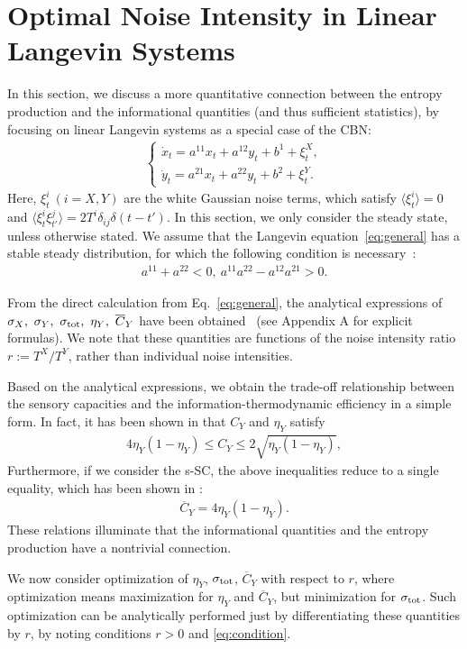 \documentclass[%
 reprint,
 amsmath,amssymb,
 aps,
]{revtex4-1}
\newcommand{\balign}[1]{\begin{align} #1 \end{align}}
\newcommand{\average}[1]{\ensuremath{\langle#1\rangle} }
\newcommand{\eref}[1]{Eq.~\eqref{#1}}
\theoremstyle{plain}
\begin{document}
\section{\label{sec:LLS}Optimal Noise Intensity in Linear Langevin Systems}
In this section, we discuss a more quantitative connection between the entropy production and the informational quantities (and thus sufficient statistics), by focusing on linear Langevin systems as a special case of the CBN:
\begin{eqnarray}
\begin{cases}
\dot{x}_t=a^{11}x_t+a^{12}y_t+b^1+\xi^X_t, \\
\dot{y}_t=a^{21}x_t+a^{22}y_t+b^2+\xi^Y_t. \label{eq:general}
\end{cases}
\end{eqnarray}
Here, $\xi^i_t\ (i=X,Y)$ are the white Gaussian noise terms, which satisfy $\average{\xi^i_t}=0$ and
 $\average{\xi^i_t\xi^j_{t'}}=2T^i\delta_{ij}\delta(t-t')$. In this section, we only consider the steady state, unless otherwise stated. We assume that the Langevin equation~\eqref{eq:general} has a stable steady distribution, for which the following condition is necessary~\cite{Gardiner}: 
\balign{
a^{11}+a^{22}<0, \  a^{11}a^{22}-a^{12}a^{21}>0 \label{eq:condition}.
}

From the direct calculation from \eref{eq:general}, the analytical expressions of $\sigma_{X},\ \sigma_{Y},\ \sigma_{\rm tot},\ \eta_{Y},\ \overline{C}_Y$ have been obtained~\cite{Hartich2016} (see Appendix A for explicit formulas).  We note that these quantities  are functions of the noise intensity ratio $r:=T^X/T^Y$, rather than individual noise intensities. 

Based on the analytical expressions, we obtain the trade-off relationship between the sensory capacities and the information-thermodynamic efficiency in a simple form. In fact, it has been shown in \cite{Hartich2016} that $C_Y$ and $\eta_Y$ satisfy
\balign{ 
4\eta_{Y}(1-\eta_{Y})\leq C_Y \leq 2\sqrt{\eta_{Y}(1-\eta_{Y})}, \label{eq:con}
}
Furthermore, if we consider the s-SC, the above inequalities reduce to a single equality, which has been shown in \cite{phd}:
\balign{
\overline{C}_Y=4\eta_{Y}(1-\eta_{Y}). \label{eq:claim4}
} 
These relations illuminate that the informational quantities and the entropy production have a nontrivial connection.

We now consider optimization of $\eta_Y$, $\sigma_{\rm tot}$, $\overline{C}_Y$ with respect to $r$, where optimization means maximization for $\eta_Y$ and  $\overline{C}_Y$, but minimization for  $\sigma_{\rm tot}$.
Such optimization can be analytically performed just by differentiating these quantities by $r$, by noting conditions $r>0$ and \eqref{eq:condition}.  
\end{document}
